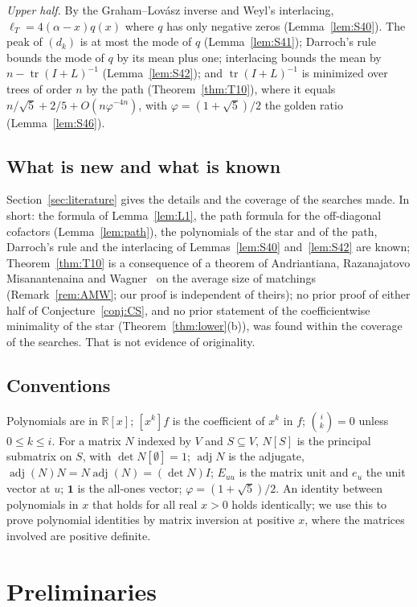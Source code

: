 \documentclass[11pt]{amsart}
\theoremstyle{definition}
\theoremstyle{remark}
\newcommand{\tr}{\operatorname{tr}}
\newcommand{\adj}{\operatorname{adj}}
\newcommand{\one}{\mathbf 1}
\begin{document}
\emph{Upper half.} By the Graham--Lov\'asz inverse and Weyl's interlacing,
$\ell_T=4(\alpha-x)q(x)$ where $q$ has only negative zeros
(Lemma~\ref{lem:S40}). The peak of $(d_k)$ is at most the mode of $q$
(Lemma~\ref{lem:S41}); Darroch's rule bounds the mode of $q$ by its mean plus
one; interlacing bounds the mean by $n-\tr(I+L)^{-1}$ (Lemma~\ref{lem:S42});
and $\tr(I+L)^{-1}$ is minimized over trees of order $n$ by the path
(Theorem~\ref{thm:T10}), where it equals
$n/\sqrt5+2/5+O(n\varphi^{-4n})$, with $\varphi=(1+\sqrt5)/2$ the golden
ratio (Lemma~\ref{lem:S46}).

\subsection*{What is new and what is known}
Section~\ref{sec:literature} gives the details and the coverage of the
searches made. In short: the formula of Lemma~\ref{lem:L1}, the path formula
for the off-diagonal cofactors (Lemma~\ref{lem:path}), the polynomials of the
star and of the path, Darroch's rule and the interlacing of
Lemmas~\ref{lem:S40} and~\ref{lem:S42} are known; Theorem~\ref{thm:T10} is
a consequence of a theorem of Andriantiana, Razanajatovo Misanantenaina and
Wagner~\cite{AMW} on the average size of matchings
(Remark~\ref{rem:AMW}; our proof is independent of theirs); no prior
proof of either half of Conjecture~\ref{conj:CS}, and no prior statement of
the coefficientwise minimality of the star (Theorem~\ref{thm:lower}(b)), was
found within the coverage of the searches. That is not evidence of
originality.

\subsection*{Conventions}
Polynomials are in $\mathbb R[x]$; $[x^k]f$ is the coefficient of $x^k$ in
$f$; $\binom ik=0$ unless $0\le k\le i$. For a matrix $N$ indexed by $V$ and
$S\subseteq V$, $N[S]$ is the principal submatrix on $S$, with
$\det N[\emptyset]=1$; $\adj N$ is the adjugate, $\adj(N)N=N\adj(N)=(\det N)I$;
$E_{uu}$ is the matrix unit and $e_u$ the unit vector at $u$; $\one$ is the
all-ones vector; $\varphi=(1+\sqrt5)/2$. An identity between polynomials in $x$ that holds for all
real $x>0$ holds identically; we use this to prove polynomial identities by
matrix inversion at positive $x$, where the matrices involved are positive
definite.

\section{Preliminaries}\label{sec:prelim}
\end{document}
